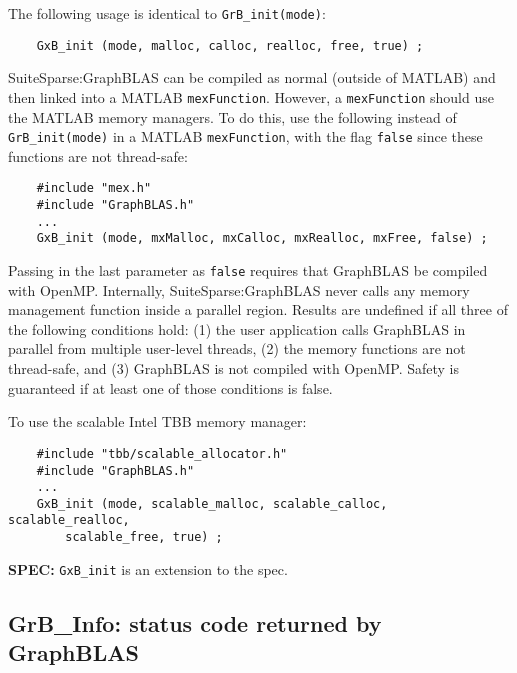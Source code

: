 \documentclass[12pt]{article}
\begin{document}
The following usage is identical to \verb'GrB_init(mode)':

    {\footnotesize
    \begin{verbatim}
    GxB_init (mode, malloc, calloc, realloc, free, true) ; \end{verbatim}}

SuiteSparse:GraphBLAS can be compiled as normal (outside of MATLAB) and then
linked into a MATLAB \verb'mexFunction'.  However, a \verb'mexFunction' should
use the MATLAB memory managers.  To do this, use the following instead of
\verb'GrB_init(mode)' in a MATLAB \verb'mexFunction', with the flag
\verb'false' since these functions are not thread-safe:

    {\footnotesize
    \begin{verbatim}
    #include "mex.h"
    #include "GraphBLAS.h"
    ...
    GxB_init (mode, mxMalloc, mxCalloc, mxRealloc, mxFree, false) ; \end{verbatim}}

Passing in the last parameter as \verb'false' requires that GraphBLAS be
compiled with OpenMP.  Internally, SuiteSparse:GraphBLAS never calls any memory
management function inside a parallel region.  Results are undefined if all
three of the following conditions hold: (1) the user application calls
GraphBLAS in parallel from multiple user-level threads, (2) the memory
functions are not thread-safe, and (3) GraphBLAS is not compiled with OpenMP.
Safety is guaranteed if at least one of those conditions is false.

To use the scalable Intel TBB memory manager:

    {\footnotesize
    \begin{verbatim}
    #include "tbb/scalable_allocator.h"
    #include "GraphBLAS.h"
    ...
    GxB_init (mode, scalable_malloc, scalable_calloc, scalable_realloc,
        scalable_free, true) ; \end{verbatim}}

\begin{spec}
{\bf SPEC:} \verb'GxB_init' is an extension to the spec.
\end{spec}

\newpage
\subsection{{\sf GrB\_Info:} status code returned by GraphBLAS} %
\label{info}
\end{document}
